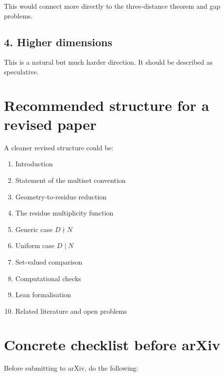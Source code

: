 \documentclass[11pt]{article}
\begin{document}
This would connect more directly to the three-distance theorem and gap
problems.

\subsection*{4. Higher dimensions}

This is a natural but much harder direction.  It should be described as
speculative.

\section*{Recommended structure for a revised paper}

A cleaner revised structure could be:

\begin{enumerate}
    \item Introduction
    \item Statement of the multiset convention
    \item Geometry-to-residue reduction
    \item The residue multiplicity function
    \item Generic case \(D\nmid N\)
    \item Uniform case \(D\mid N\)
    \item Set-valued comparison
    \item Computational checks
    \item Lean formalisation
    \item Related literature and open problems
\end{enumerate}

\section*{Concrete checklist before arXiv}

Before submitting to arXiv, do the following:
\end{document}
